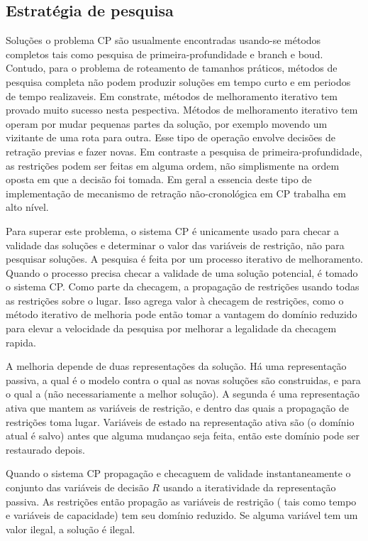 \subsection{Estratégia de pesquisa}

 Soluções o problema CP são usualmente encontradas usando-se métodos completos tais como pesquisa de
primeira-profundidade e branch e boud. Contudo, para o problema de roteamento de tamanhos práticos,
métodos de pesquisa completa não podem produzir soluções em tempo curto e em periodos de tempo
realizaveis. Em constrate, métodos de melhoramento iterativo tem provado muito sucesso nesta
pespectiva. Métodos de melhoramento iterativo tem operam por mudar pequenas partes da solução, por
exemplo movendo um vizitante de uma rota para outra. Esse tipo de operação envolve decisões de
retração previas e fazer novas. Em contraste a pesquisa de primeira-profundidade, as restrições
podem ser feitas em alguma ordem, não simplismente na ordem oposta em que a decisão foi tomada. Em
geral a essencia deste tipo de implementação de mecanismo de retração não-cronológica em CP trabalha
em alto nível.

 Para superar este problema, o sistema CP é unicamente usado para checar a validade das soluções e
determinar o valor das variáveis de restrição, não para pesquisar soluções. A pesquisa é feita por
um processo iterativo de melhoramento. Quando o processo precisa checar a validade de uma solução
potencial, é tomado o sistema CP. Como parte da checagem, a propagação de restrições usando todas as
restrições sobre o lugar. Isso agrega valor à checagem de restrições,  como o método iterativo de 
melhoria pode então tomar a vantagem do domínio reduzido para elevar a velocidade da pesquisa por
melhorar a legalidade da checagem rapida.

 A melhoria depende de duas representações da solução. Há uma representação passiva, a qual é o
modelo contra o qual as novas soluções são construidas, e para o qual a (não necessariamente a
melhor solução). A segunda é uma representação ativa que mantem as variáveis de restrição, e dentro
das quais a propagação de restrições toma lugar. Variáveis de estado na representação ativa são (o
domínio atual é salvo) antes  que alguma mudançao seja feita, então este domínio pode ser restaurado
depois.

 Quando o sistema CP propagação e checaguem de validade instantaneamente o conjunto das variáveis de
decisão $R$ usando a iteratividade da representação passiva. As restrições então propagão as
variáveis de restrição ( tais como tempo e variáveis de capacidade) tem seu domínio reduzido. Se
alguma variável tem um valor ilegal, a solução é ilegal.

